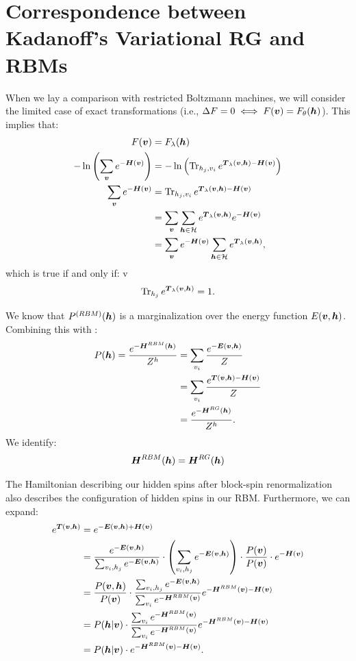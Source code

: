 \section{Correspondence between Kadanoff's Variational RG and
  RBMs}\label{sec:mehta-equivalence}
When we lay a comparison with restricted Boltzmann machines, we will
consider the limited case of exact transformations (i.e.,
$\Delta F=0 \iff F(\bv)=F_\theta(\bh)$). This implies that:%
\begin{align}
  F(\bv) &= F_\l(\bh) \\
  -\ln\left(\sum_{\bv} e^{-\bH(\bv)} \right) &= -\ln\left(\Tr_{h_j,v_i}e^{\bT_\l(\bv,\bh)-\bH(\bv)}\right) \\
  \sum_{\bv} e^{-\bH(\bv)} &= \Tr_{h_j,v_i}e^{\bT_\l(\bv,\bh)-\bH(\bv)} \\
         &= \sum_{\bv} \sum_{\bh\in\mcH} e^{\bT_\l(\bv,\bh)}e^{-\bH(\bv)} \\
         &= \sum_{\bv} e^{-\bH(\bv)} \sum_{\bh\in\mcH} e^{\bT_\l(\bv,\bh)},
\end{align}
which is true if and only if:
v\begin{equation}
  \Tr_{h_j}e^{\bT_\l(\bv,\bh)}=1.\label{eq:kadanoff-exact}
\end{equation}

We know that $P^{(RBM)}(\bh)$ is a marginalization over the energy
function $E(\bv,\bh)$. Combining this with :
\begin{align}
  P(\bh)= \frac{e^{-\bolds{H}^{RBM}(\bh)}}{Z^h} &= \sum_{v_i}\frac{e^{-\bolds{E}(\bv,\bh)}}{Z} \\
                                                &= \sum_{v_i}\frac{e^{\bT(\bv,\bh)-\bolds{H}(\bv)}}{Z} \\
                                                &= \frac{e^{-\bolds{H}^{RG}(\bh)}}{Z^h}.
\end{align}
We identify:
\begin{equation}
  \bolds{H}^{RBM}(\bh)=\bolds{H}^{RG}(\bh)
\end{equation}

The Hamiltonian describing our hidden spins after block-spin
renormalization also describes the configuration of hidden spins in
our RBM\@. Furthermore, we can expand:%
\begin{align}
  e^{\bT(\bv,\bh)}
  &=e^{-\bolds{E}(\bv,\bh)+\bolds{H}(\bv)} \\ &= \frac{e^{-\bolds{E}(\bv, \bh)}}{\sum_{v_i,h_j} e^{-\bolds{E}(\bv, \bh)}} \cdot \left(\sum_{v_i,h_j} e^{-\bolds{E}(\bv, \bh)}\right) \cdot \frac{P(\bv)}{P(\bv)} \cdot e^{-\bolds{H}(\bv)}\\
  &=\frac{P(\bv,\bh)} {P(\bv)} \cdot \frac{\sum_{v_i,h_j} e^{-\bolds{E}(\bv, \bh)}}{\sum_{v_i} e^{-\bolds{H}^{RBM}(\bv)}} e^{-\bolds{H}^{RBM}(\bv)-\bolds{H}(\bv)}\\
  &=P(\bh|\bv) \cdot  \frac{\sum_{v_i} e^{-\bolds{H}^{RBM}(\bv)}}{\sum_{v_i} e^{-\bolds{H}^{RBM}(\bv)}}
    e^{-\bolds{H}^{RBM}(\bv)-\bolds{H}(\bv)}\\
  &=P(\bh|\bv) \cdot
    e^{-\bolds{H}^{RBM}(\bv)-\bolds{H}(\bv)}.
\end{align}

